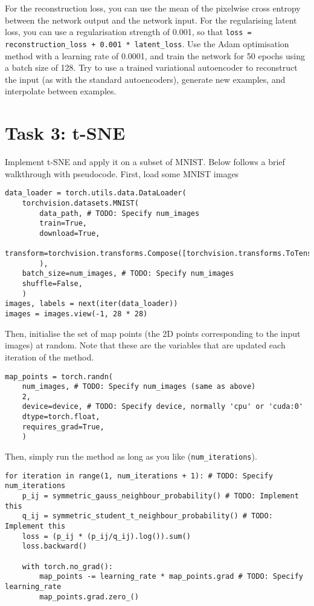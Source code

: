 \documentclass[paper=a4, fontsize=11pt]{article} %
\numberwithin{equation}{section} %
\numberwithin{figure}{section} %
\numberwithin{table}{section} %
\begin{document}
For the reconstruction loss, you can use the mean of the pixelwise cross entropy between the
network output and the network input. For the regularising latent loss, you can use a
regularisation strength of 0.001, so that
\texttt{loss = reconstruction\_loss + 0.001 * latent\_loss}. Use the Adam optimisation method with
a learning rate of 0.0001, and train the network for 50 epochs using a batch size of 128. Try to
use a trained variational autoencoder to reconstruct the input (as with the standard autoencoders),
generate new examples, and interpolate between examples.

\section*{Task 3: t-SNE}

\noindent Implement t-SNE and apply it on a subset of MNIST\@. Below follows a brief walkthrough
with pseudocode. First, load some MNIST images
%
\begin{lstlisting}
data_loader = torch.utils.data.DataLoader(
    torchvision.datasets.MNIST(
        data_path, # TODO: Specify num_images
        train=True,
        download=True,
        transform=torchvision.transforms.Compose([torchvision.transforms.ToTensor()]),
        ),
    batch_size=num_images, # TODO: Specify num_images
    shuffle=False,
    )
images, labels = next(iter(data_loader))
images = images.view(-1, 28 * 28)
\end{lstlisting}
%
\noindent Then, initialise the set of map points (the 2D points corresponding to the input images) at random.
Note that these are the variables that are updated each iteration of the method.
%
\begin{lstlisting}
map_points = torch.randn(
    num_images, # TODO: Specify num_images (same as above)
    2,
    device=device, # TODO: Specify device, normally 'cpu' or 'cuda:0'
    dtype=torch.float,
    requires_grad=True,
    )
\end{lstlisting}
%
\noindent Then, simply run the method as long as you like (\texttt{num\_iterations}).
%
\begin{lstlisting}
for iteration in range(1, num_iterations + 1): # TODO: Specify num_iterations
    p_ij = symmetric_gauss_neighbour_probability() # TODO: Implement this
    q_ij = symmetric_student_t_neighbour_probability() # TODO: Implement this
    loss = (p_ij * (p_ij/q_ij).log()).sum()
    loss.backward()

    with torch.no_grad():
        map_points -= learning_rate * map_points.grad # TODO: Specify learning_rate
        map_points.grad.zero_()
\end{lstlisting}
\end{document}
